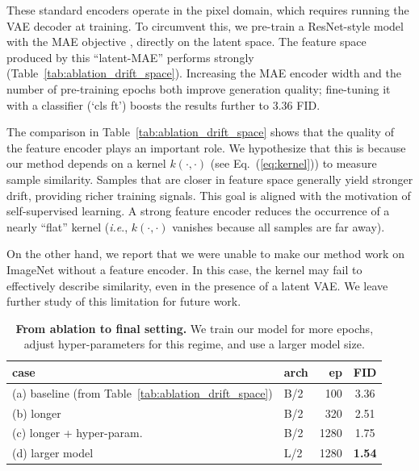 \documentclass{article}
\newcommand{\tablestyle}[2]{\setlength{\tabcolsep}{#1}\renewcommand{\arraystretch}{#2}\centering
\small
}
\newcommand\tablefontsize{%
  \fontsize{8pt}{9pt}\selectfont
}
\def\onedot{.}
\def\ie{\emph{i.e}\onedot} \def\Ie{\emph{I.e}\onedot}
\theoremstyle{plain}
\theoremstyle{definition}
\theoremstyle{remark}
\begin{document}
These standard encoders operate in the pixel domain, which requires running the VAE decoder at training.
To circumvent this, we pre-train a ResNet-style model with the MAE objective \cite{he2022masked}, directly on the latent space.
The feature space produced by this ``latent-MAE'' performs strongly (Table~\ref{tab:ablation_drift_space}). Increasing the MAE encoder width and the number of pre-training epochs both improve generation quality; fine-tuning it with a classifier (`cls ft') boosts the results further to 3.36 FID.

The comparison in Table~\ref{tab:ablation_drift_space} shows that the quality of the feature encoder plays an important role.
We hypothesize that this is because our method depends on a kernel $k(\cdot, \cdot)$ (see Eq.~(\ref{eq:kernel})) to measure sample similarity. Samples that are closer in feature space generally yield stronger drift, providing richer training signals. This goal is aligned with the motivation of self-supervised learning.
A strong feature encoder reduces the occurrence of a nearly ``flat'' kernel (\ie, $k(\cdot, \cdot)$ vanishes because all samples are far away).


On the other hand, we report that we were unable to make our method work on ImageNet without a feature encoder. In this case, the kernel may fail to effectively describe similarity, even in the presence of a latent VAE. We leave further study of this limitation for future work.

\begin{table}[t]
    \centering
    \caption{\textbf{From ablation to final setting.} We train our model for more epochs, adjust hyper-parameters for this regime, and use a larger model size.
    }
\label{tab:ablation_final}
    \tablestyle{6pt}{1.02}
    \tablefontsize
    \begin{tabular}{l |l r| c}
    \toprule
    case & arch & ep & FID \\
    \midrule
    (a) baseline (from Table~\ref{tab:ablation_drift_space}) & B/2 & 100 & 3.36 \\
    \midrule
    (b) longer & B/2 & 320 & 2.51 \\
    (c) longer + hyper-param. & B/2 & 1280 & 1.75 \\
    (d) larger model & L/2  & 1280 & \textbf{1.54} \\
    \bottomrule
    \end{tabular}
\end{table}
\end{document}
